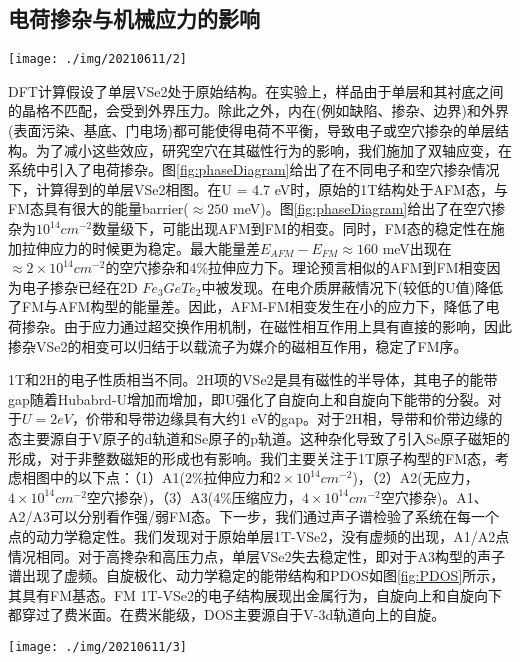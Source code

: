 \documentclass[reprint, aps, prb, showkeys]{revtex4-2}
\begin{document}
\subsection{电荷掺杂与机械应力的影响}
\begin{figure*}[b]
    \texttt{[image: ./img/20210611/2]}
    \caption{\label{fig:phaseDiagram} 
    Magnetic phase diagram calculated for monolayer 1T-VSe2 at U =4.7 eV as a function of charge doping and mechanical strain
    }
\end{figure*}
DFT计算假设了单层VSe2处于原始结构。在实验上，样品由于单层和其衬底之间的晶格不匹配，会受到外界压力。除此之外，内在(例如缺陷、掺杂、边界)和外界(表面污染、基底、门电场)都可能使得电荷不平衡，导致电子或空穴掺杂的单层结构。为了减小这些效应，研究空穴在其磁性行为的影响，我们施加了双轴应变，在系统中引入了电荷掺杂。图\ref{fig:phaseDiagram}给出了在不同电子和空穴掺杂情况下，计算得到的单层VSe2相图。在U = 4.7 eV时，原始的1T结构处于AFM态，与FM态具有很大的能量barrier($\approx 250$ meV)。图\ref{fig:phaseDiagram}给出了在空穴掺杂为$10^{14} cm^{-2}$数量级下，可能出现AFM到FM的相变。同时，FM态的稳定性在施加拉伸应力的时候更为稳定。最大能量差$E_{AFM} - E_{FM} \approx 160$ meV出现在$\approx 2 \times 10^{14} cm^{-2}$的空穴掺杂和4\%拉伸应力下。理论预言相似的AFM到FM相变因为电子掺杂已经在2D $Fe_3GeTe_2$中被发现。在电介质屏蔽情况下(较低的U值)降低了FM与AFM构型的能量差。因此，AFM-FM相变发生在小的应力下，降低了电荷掺杂。由于应力通过超交换作用机制，在磁性相互作用上具有直接的影响，因此掺杂VSe2的相变可以归结于以载流子为媒介的磁相互作用，稳定了FM序。

1T和2H的电子性质相当不同。2H项的VSe2是具有磁性的半导体，其电子的能带gap随着Hubabrd-U增加而增加，即U强化了自旋向上和自旋向下能带的分裂。对于$U = 2eV$，价带和导带边缘具有大约1 eV的gap。对于2H相，导带和价带边缘的态主要源自于V原子的d轨道和Se原子的p轨道。这种杂化导致了引入Se原子磁矩的形成，对于非整数磁矩的形成也有影响。我们主要关注于1T原子构型的FM态，考虑相图中的以下点：（1）A1(2\%拉伸应力和$2 \times 10^{14} cm^{-2}$)，（2）A2(无应力，$4 \times 10^{14} cm^{-2}$空穴掺杂)，（3）A3(4\%压缩应力，$4 \times 10^{14} cm^{-2}$空穴掺杂)。A1、A2/A3可以分别看作强/弱FM态。下一步，我们通过声子谱检验了系统在每一个点的动力学稳定性。我们发现对于原始单层1T-VSe2，没有虚频的出现，A1/A2点情况相同。对于高搀杂和高压力点，单层VSe2失去稳定性，即对于A3构型的声子谱出现了虚频。自旋极化、动力学稳定的能带结构和PDOS如图\ref{fig:PDOS}所示，其具有FM基态。FM 1T-VSe2的电子结构展现出金属行为，自旋向上和自旋向下都穿过了费米面。在费米能级，DOS主要源自于V-3d轨道向上的自旋。
\begin{figure*}[t]
    \texttt{[image: ./img/20210611/3]}
    \caption{\label{fig:PDOS} 
    Spin-polarized band structure and PDOS calculated for ferromagnetic monolayer 1T-VSe2
    }
\end{figure*}
\end{document}

